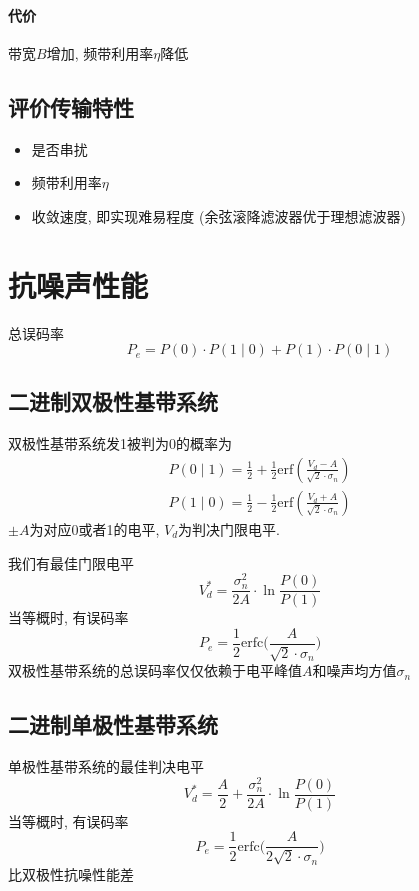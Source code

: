 \documentclass[a4paper]{report}
\begin{document}
\paragraph{代价} 带宽$B$增加, 频带利用率$\eta$降低
\subsection{评价传输特性}
\begin{itemize}
  \item 是否串扰
  \item 频带利用率$\eta$
  \item 收敛速度, 即实现难易程度 (余弦滚降滤波器优于理想滤波器)
\end{itemize}
\section{抗噪声性能}
总误码率
\begin{equation}
  P_e=P(0)\cdot P(1\mid 0)+P(1)\cdot P(0\mid 1)
\end{equation}
\subsection{二进制双极性基带系统}
双极性基带系统发1被判为0的概率为
\begin{align*}
    P(0\mid 1)=\frac{1}{2}+\frac{1}{2}\text{erf}(\frac{V_d-A}{\sqrt{2}\cdot \sigma_n})
    \\   P(1\mid 0)=\frac{1}{2}-\frac{1}{2}\text{erf}(\frac{V_d+A}{\sqrt{2}\cdot \sigma_n})
\end{align*}
$\pm A$为对应0或者1的电平, $V_d$为判决门限电平. 

我们有最佳门限电平
\begin{equation}
  V_d^*=\frac{\sigma^2_n}{2A}\cdot\ln{\frac{P(0)}{P(1)}}
\end{equation}
当等概时, 有误码率
\begin{equation}
  P_e=\frac{1}{2}\text{erfc}\bigg(\frac{A}{\sqrt{2}\cdot \sigma_n}\bigg)
\end{equation}
双极性基带系统的总误码率仅仅依赖于电平峰值$A$和噪声均方值$\sigma_n$
\subsection{二进制单极性基带系统}
单极性基带系统的最佳判决电平
\begin{equation}
  V_d^*=\frac{A}{2}+\frac{\sigma^2_n}{2A}\cdot\ln{\frac{P(0)}{P(1)}}
\end{equation}
当等概时, 有误码率
\begin{equation}
  P_e=\frac{1}{2}\text{erfc}\bigg(\frac{A}{2\sqrt{2}\cdot \sigma_n}\bigg)
\end{equation}
比双极性抗噪性能差
\end{document}
